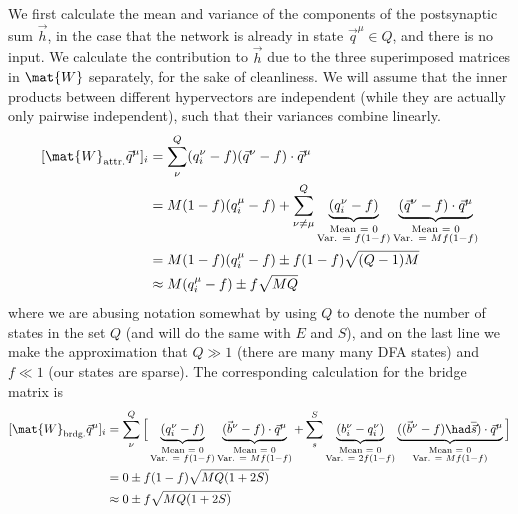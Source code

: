We first calculate the mean and variance of the components of the postsynaptic sum $\vec{h}$, in the case that the network is already in state $\vec{q}^\mu \in Q$, and there is no input. We calculate the contribution to $\vec{h}$ due to the three superimposed matrices in $\mat{W}$ separately, for the sake of cleanliness. We will assume that the inner products between different hypervectors are independent (while they are actually only pairwise independent), such that their variances combine linearly.
\begin{equation}
\begin{split}
    [\mat{W}_\text{attr.} \vec{q}^\mu]_i & = \sum_\nu^Q (q_i^\nu -f)(\vec{q}^\nu -f ) \cdot \vec{q}^\mu \\
    & = M(1-f)(q_i^\mu -f) + \sum_{\nu \neq \mu}^Q \underbrace{(q_i^\nu -f)}_{\substack{\text{Mean = 0} \\ \text{Var. = } f(1-f)}}\underbrace{(\vec{q}^\nu -f ) \cdot \vec{q}^\mu}_{\substack{\text{Mean = 0} \\ \text{Var. = } Mf(1-f)}} \\
    & =  M(1-f)(q_i^\mu -f) \pm f(1-f)\sqrt{(Q-1)M} \\
    & \approx  M(q_i^\mu -f) \pm f\sqrt{MQ}
\end{split}
\end{equation}
where we are abusing notation somewhat by using $Q$ to denote the number of states in the set $Q$ (and will do the same with $E$ and $S$), and on the last line we make the approximation that $Q \gg 1$ (there are many many DFA states) and $f \ll 1$ (our states are sparse). The corresponding calculation for the bridge matrix is
\begin{equation}
\begin{split}
    [\mat{W}_\text{brdg.} \vec{q}^\mu]_i & = \sum_{\nu}^Q \Big[ \underbrace{(q_i^\nu -f)}_{\substack{\text{Mean = 0} \\ \text{Var. = } f(1-f)}}\underbrace{(\vec{b}^\nu -f ) \cdot \vec{q}^\mu}_{\substack{\text{Mean = 0} \\ \text{Var. = } Mf(1-f)}} + \sum_s^S \underbrace{(b_i^\nu -q_i^\nu)}_{\substack{\text{Mean = 0} \\ \text{Var. = } 2f(1-f)}}\underbrace{((\vec{b}^\nu -f) \had \overline{\vec{s}} ) \cdot \vec{q}^\mu}_{\substack{\text{Mean = 0} \\ \text{Var. = } Mf(1-f)}} \Big] \\
    & = 0 \pm f(1-f) \sqrt{MQ(1+2S)} \\
    & \approx 0 \pm f \sqrt{MQ(1+2S)} \\
\end{split}
\end{equation}
